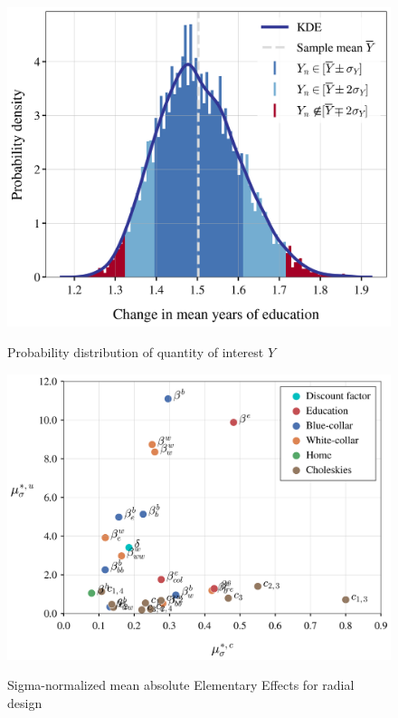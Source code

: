 \begin{figure}[H]
	\caption{Probability distribution of quantity of interest $Y$}
	\centering
	\includegraphics[scale=0.55]{../scrypy/figures/distplot}
	\label{fig:dist}
\end{figure}

\begin{figure}[H]
	\caption{Sigma-normalized mean absolute Elementary Effects for radial design}
	\centering
	\includegraphics[scale=0.52]{../scrypy/figures/scatter_rad}
	\label{fig:rad}
\end{figure}


